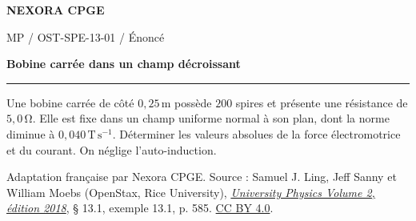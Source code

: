 \documentclass[11pt,a4paper]{article}
\begin{document}
\makeatletter
\def\@oddfoot{\footnotesize Download for free at \url{https://openstax.org/details/books/university-physics-volume-2}.\hfil\thepage}
\let\@evenfoot\@oddfoot
\makeatother
{\small\bfseries\color{nexorablue} NEXORA CPGE}\par
{\small MP / OST-SPE-13-01 / Énoncé}\par
{\LARGE\bfseries Bobine carrée dans un champ décroissant}\par
\vspace{0.25em}\hrule\vspace{0.6em}

Une bobine carrée de côté $0{,}25\,\mathrm m$ possède $200$ spires et présente une résistance de $5{,}0\,\mathrm\Omega$. Elle est fixe dans un champ uniforme normal à son plan, dont la norme diminue à $0{,}040\,\mathrm{T\,s^{-1}}$. Déterminer les valeurs absolues de la force électromotrice et du courant. On néglige l’auto-induction.

\bigskip
{\footnotesize Adaptation française par Nexora CPGE. Source : Samuel J. Ling, Jeff Sanny et William Moebs (OpenStax, Rice University),
\href{https://d3bxy9euw4e147.cloudfront.net/oscms-prod/media/documents/UniversityPhysicsVolume2-OP.pdf\#page=595}{\textit{University Physics Volume 2, édition 2018}}, § 13.1, exemple 13.1, p. 585.
\href{https://creativecommons.org/licenses/by/4.0/}{CC BY 4.0}.}
\end{document}
